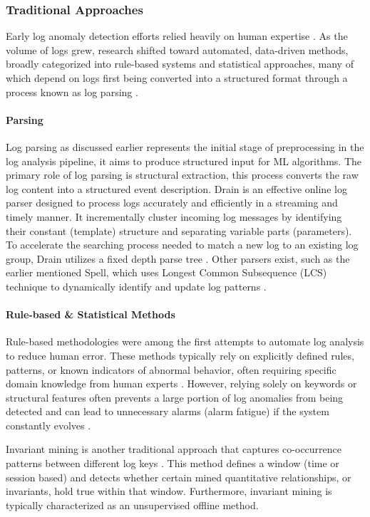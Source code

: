 \subsubsection{Traditional Approaches}
Early log anomaly detection efforts relied heavily on human expertise \cite{LogCTBL}. As the volume of logs grew, research shifted toward automated, data-driven methods, broadly categorized into rule-based systems and statistical approaches, many of which depend on logs first being converted into a structured format through a process known as log parsing \cite{Drain}.

\paragraph*{Parsing}
Log parsing as discussed earlier represents the initial stage of preprocessing in the log analysis pipeline, it aims to produce structured input for ML algorithms. The primary role of log parsing is structural extraction, this process converts the raw log content into a structured event description. Drain is an effective online log parser designed to process logs accurately and efficiently in a streaming and timely manner. It incrementally cluster incoming log messages by identifying their constant (template) structure and separating variable parts (parameters). To accelerate the searching process needed to match a new log to an existing log group, Drain utilizes a fixed depth parse tree \cite{Drain}. Other parsers exist, such as the earlier mentioned Spell, which uses Longest Common Subsequence (LCS) technique to dynamically identify and update log patterns \cite{Spell}.

\paragraph*{Rule-based \& Statistical Methods}
Rule-based methodologies were among the first attempts to automate log analysis to reduce human error. These methods typically rely on explicitly defined rules, patterns, or known indicators of abnormal behavior, often requiring specific domain knowledge from human experts \cite{robust}. However, relying solely on keywords or structural features often prevents a large portion of log anomalies from being detected and can lead to unnecessary alarms (alarm fatigue) if the system constantly evolves \cite{robust,LogAnomaly}.

Invariant mining is another traditional approach that captures co-occurrence patterns between different log keys \cite{DeepLog,LogAnomaly}. This method defines a window (time or session based) and detects whether certain mined quantitative relationships, or invariants, hold true within that window. Furthermore, invariant mining is typically characterized as an unsupervised offline method.

